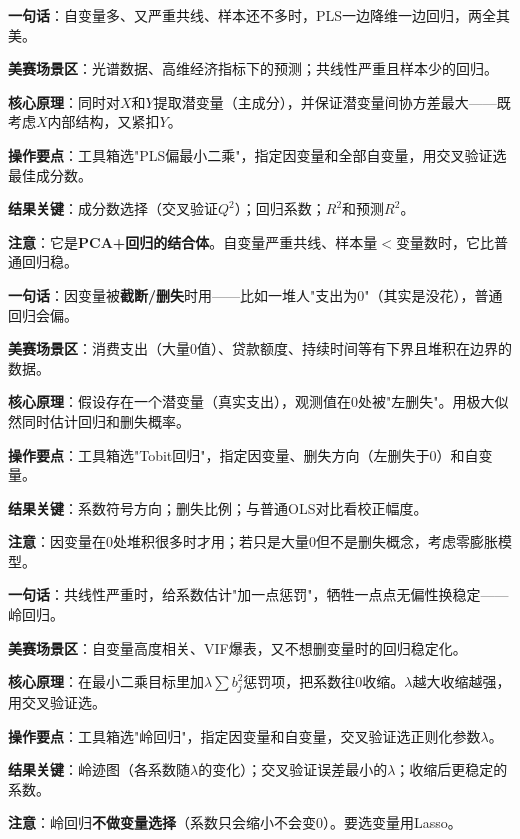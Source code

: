 
\begin{algobrief}
\textbf{一句话}：自变量多、又严重共线、样本还不多时，PLS一边降维一边回归，两全其美。

\textbf{美赛场景区}：光谱数据、高维经济指标下的预测；共线性严重且样本少的回归。

\textbf{核心原理}：同时对$X$和$Y$提取潜变量（主成分），并保证潜变量间协方差最大——既考虑$X$内部结构，又紧扣$Y$。

\textbf{操作要点}：工具箱选"PLS偏最小二乘"，指定因变量和全部自变量，用交叉验证选最佳成分数。

\textbf{结果关键}：成分数选择（交叉验证$Q^2$）；回归系数；$R^2$和预测$R^2$。

\textbf{注意}：它是\textbf{PCA+回归的结合体}。自变量严重共线、样本量$<$变量数时，它比普通回归稳。
\end{algobrief}


\begin{algobrief}
\textbf{一句话}：因变量被\textbf{截断/删失}时用——比如一堆人"支出为0"（其实是没花），普通回归会偏。

\textbf{美赛场景区}：消费支出（大量0值）、贷款额度、持续时间等有下界且堆积在边界的数据。

\textbf{核心原理}：假设存在一个潜变量（真实支出），观测值在0处被"左删失"。用极大似然同时估计回归和删失概率。

\textbf{操作要点}：工具箱选"Tobit回归"，指定因变量、删失方向（左删失于0）和自变量。

\textbf{结果关键}：系数符号方向；删失比例；与普通OLS对比看校正幅度。

\textbf{注意}：因变量在0处堆积很多时才用；若只是大量0但不是删失概念，考虑零膨胀模型。
\end{algobrief}


\begin{algobrief}
\textbf{一句话}：共线性严重时，给系数估计"加一点惩罚"，牺牲一点点无偏性换稳定——岭回归。

\textbf{美赛场景区}：自变量高度相关、VIF爆表，又不想删变量时的回归稳定化。

\textbf{核心原理}：在最小二乘目标里加$\lambda\sum b_j^2$惩罚项，把系数往0收缩。$\lambda$越大收缩越强，用交叉验证选。

\textbf{操作要点}：工具箱选"岭回归"，指定因变量和自变量，交叉验证选正则化参数$\lambda$。

\textbf{结果关键}：岭迹图（各系数随$\lambda$的变化）；交叉验证误差最小的$\lambda$；收缩后更稳定的系数。

\textbf{注意}：岭回归\textbf{不做变量选择}（系数只会缩小不会变0）。要选变量用Lasso。
\end{algobrief}

